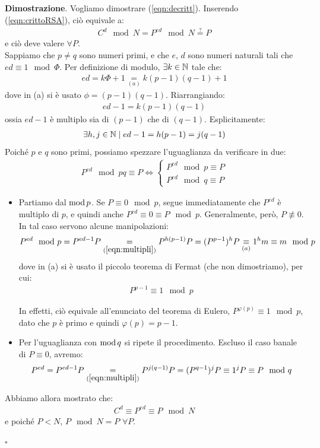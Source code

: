 \documentclass[../../InformazioneQuantistica.tex]{subfiles}
\begin{document}
\textbf{Dimostrazione}.
Vogliamo dimostrare (\ref{eqn:decritt}). Inserendo (\ref{eqn:crittoRSA}), ciò equivale a:
\begin{align}
C^d \mod N = P^{ed} \mod N \overset{?}{=} P
\label{eqn:C-d}
\end{align}
e ciò deve valere $\forall P$.\\
Sappiamo che $p \neq q$ sono numeri primi, e che $e$, $d$ sono numeri naturali tali che $ed \equiv 1 \mod \Phi$. Per definizione di modulo, $\exists k \in \mathbb{N}$ tale che:
\begin{align*}
    ed = k\Phi + 1 \underset{(a)}{=} k(p-1)(q-1) + 1
\end{align*}
dove in (a) si è usato $\phi = (p-1)(q-1)$. Riarrangiando:
\begin{align*}
    ed - 1 = k(p-1)(q-1)
\end{align*}
ossia $ed-1$ è multiplo sia di $(p-1)$ che di $(q-1)$. Esplicitamente:
\begin{align}
    \label{eqn:multipli}
    \exists h,j \in \mathbb{N} \mid ed-1 = h(p-1) = j(q-1)
\end{align}
Poiché $p$ e $q$ sono primi, possiamo spezzare l'uguaglianza da verificare in due:
\begin{align*}
    P^{ed} \mod pq \equiv P \Leftrightarrow \begin{cases}
    P^{ed} \mod p \equiv P\\
    P^{ed} \mod q \equiv P
    \end{cases}
\end{align*}
\begin{itemize}
    \item Partiamo dal $\operatorname{mod} p$. Se $P\equiv 0 \mod p$, segue immediatamente che $P^{ed}$ è multiplo di $p$, e quindi anche $P^{ed} \equiv 0 \equiv P \mod p$. Generalmente, però, $P \not\equiv 0$. In tal caso servono alcune manipolazioni:
    \begin{align*}
        P^{ed} \mod p = P^{ed-1} P \underset{(\ref{eqn:multipli})}{=} P^{h(p-1)} P = (P^{p-1})^h P \underset{(a)}{\equiv} 1^h m \equiv m \mod p 
    \end{align*}
    dove in (a) si è usato il piccolo teorema di Fermat (che non dimostriamo), per cui:
    \begin{align*}
        P^{p-1} \equiv 1 \mod p
    \end{align*}
    
    \begin{expl}
    In effetti, ciò equivale all'enunciato del teorema di Eulero, $P^{\varphi(p)} \equiv 1 \mod p$, dato che $p$ è primo e quindi $\varphi(p)=p-1$.
    \end{expl}
    
    \item Per l'uguaglianza con $\operatorname{mod} q$ si ripete il procedimento. Escluso il caso banale di $P\equiv 0$, avremo:
    \begin{align*}
        P^{ed} = P^{ed-1}P \underset{(\ref{eqn:multipli})}{=} P^{j(q-1)}P = (P^{q-1})^j P \equiv 1^j P \equiv P \mod q
    \end{align*}
\end{itemize}
Abbiamo allora mostrato che:
\begin{align*}
    C^d \equiv P^{ed} \equiv P \mod N
\end{align*}
e poiché $P<N$, $P\mod N = P$ $\forall P$. 
\begin{flushright}
$\square$
\end{flushright}
\end{document}
